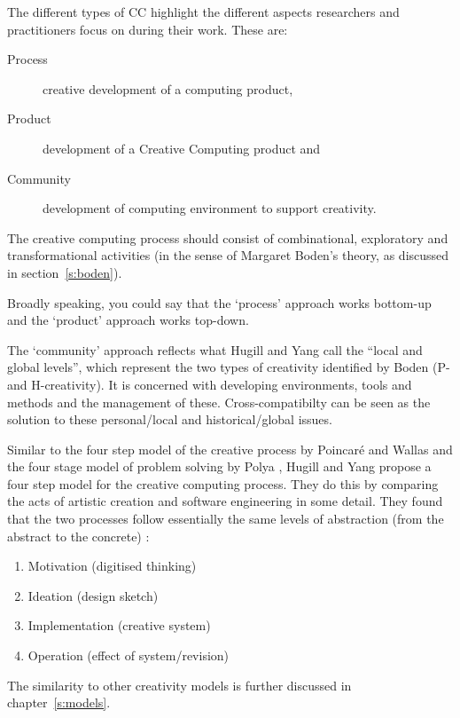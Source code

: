 The different types of \ac{CC} highlight the different aspects researchers and practitioners focus on during their work. These are:

\begin{description}
  \item [Process] creative development of a computing product,
  \item [Product] development of a Creative Computing product and
  \item [Community] development of computing environment to support creativity.
\end{description}

The creative computing process should consist of combinational, exploratory and transformational activities (in the sense of Margaret Boden’s theory, as discussed in section~\ref{s:boden}).

Broadly speaking, you could say that the `process' approach works bottom-up and the `product' approach works top-down.

The `community' approach reflects what Hugill and Yang call the ``local and global levels'', which represent the two types of creativity identified by Boden (P- and H-creativity). It is concerned with developing environments, tools and methods and the management of these. Cross-compatibilty can be seen as the solution to these personal/local and historical/global issues.

Similar to the four step model of the creative process by Poincar{\'e} and Wallas \citeyear{Poincare2001, Wallas1926} and the four stage model of problem solving by Polya \citeyear{Polya1957}, Hugill and Yang propose a four step model for the creative computing process. They do this by comparing the acts of artistic creation and software engineering in some detail. They found that the two processes follow essentially the same levels of abstraction (from the abstract to the concrete) \autocite[p.15]{Hugill2013c}:

\begin{enumerate}
  \item Motivation (digitised thinking)
  \item Ideation (design sketch)
  \item Implementation (creative system)
  \item Operation (effect of system/revision)
\end{enumerate}

The similarity to other creativity models is further discussed in chapter~\ref{s:models}.

